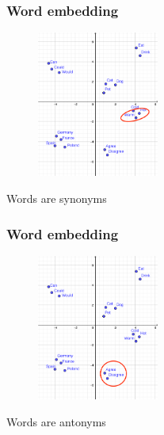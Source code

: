 \begin{frame}
	\frametitle{Word embedding}

	\begin{figure}
		\includegraphics[width=4cm]{./figures/Group_synonym}

	\end{figure}
		\begin{center}
		{Words are synonyms}
		\end{center}
	\vspace{-0.5cm}

\end{frame}



\begin{frame}
	\frametitle{Word embedding}

	\begin{figure}
		\includegraphics[width=4cm]{./figures/Group_antonyms}

	\end{figure}
		\begin{center}
		{Words are antonyms}
		\end{center}
	\vspace{-0.5cm}

\end{frame}


